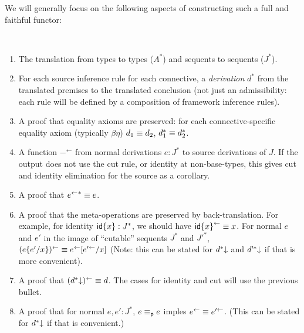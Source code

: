 \newcommand\backtrf[1]{\ensuremath{#1^{\leftarrow}}}
\newcommand\backtr[1]{\ensuremath{#1^{\Leftarrow}}}
\newcommand\str[2]{\ensuremath{\dsd{str}_{#1}(#2)}}

We will generally focus on the following aspects of constructing such a
full and faithful functor:
\begin{definition} ~
\begin{enumerate}
\item The translation from types to types ($A^*$) and sequents to
  sequents ($J^*$).

\item For each source inference rule for each connective, a
  \emph{derivation} $d^*$ from the translated premises to the translated
  conclusion (not just an admissibility: each rule will be defined by a
  composition of framework inference rules).

\item A proof that equality axioms are preserved: for each
  connective-specific equality axiom (typically $\beta\eta$) $d_1 \equiv
  d_2$, $d_1^* \equiv d_2^*$.

\item A function \backtrf{-} from normal derivations $e : J^*$ to source
  derivations of $J$.  If the output does not use the cut rule, or
  identity at non-base-types, this gives cut and identity elimination
  for the source as a corollary.

\item A proof that ${\backtrf{e}}^* \deq e$.  

\item A proof that the meta-operations are preserved by
  back-translation.  For example, for identity ${\mathsf{id}\{x\}} : J^*$, we
  should have $\backtrf{\Identa{x}} \deq x$.  For normal $e$ and $e'$ in
  the image of ``cutable'' sequents $J^*$ and $J'^*$,
  $\backtrf{(\Cuta{e}{e'}{x})} \deq \backtrf{e}[\backtrf{e'}/x]$ (Note:
  this can be stated for $d^*\mathord{\downarrow}$ and $d'^*\mathord{\downarrow}$ if that is more
  convenient).

\item A proof that $\backtrf{(\elim{d^*})} \deq d$.  The cases for
  identity and cut will use the previous bullet.

\item A proof that for normal $e,e' : J^*$, $e \equiv_{\mathsf{p}} e$ imples
  $\backtrf{e} \deq \backtrf{e'}$.  (This can be stated for
  $d^*\mathord{\downarrow}$ if that is convenient.)
\end{enumerate}
\end{definition}

